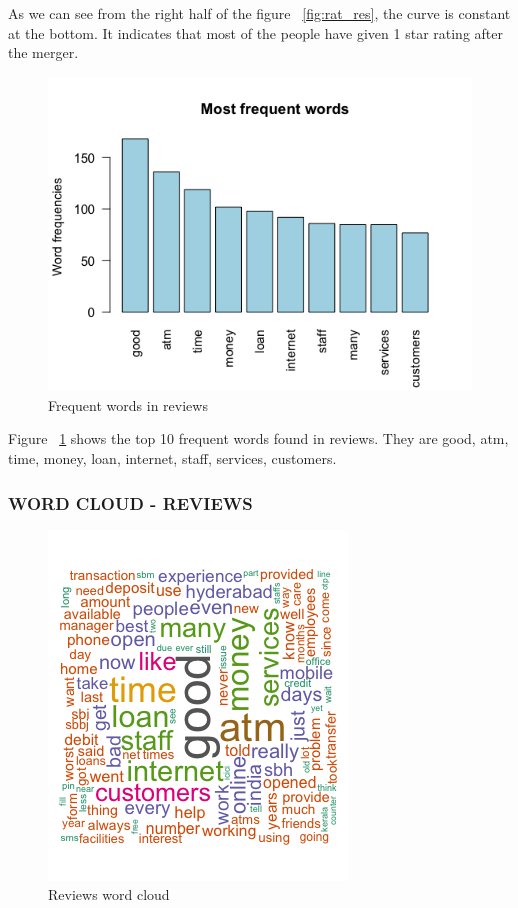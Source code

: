 \documentclass[a4paper, 12pt]{extarticle}
\begin{document}
{As we can see from the right half of the figure ~\ref{fig:rat_res}, the curve is constant at the bottom. It indicates that most of the people have given 1 star rating after the merger.

\begin{figure}[H]
\centering
\includegraphics[scale=0.5]{freq_words.png}
\caption{Frequent words in reviews}
\label{fig:freq_words}
\end{figure}

Figure ~\ref{fig:freq_words} shows the top 10 frequent words found in reviews. They are good, atm, time, money, loan, internet, staff, services, customers.


\subsubsection{WORD CLOUD - REVIEWS}
\begin{figure}[H]
\centering
\includegraphics[scale=1]{wordcloud_reviews.png}
\caption{Reviews word cloud}
\end{figure}

}
\end{document}
